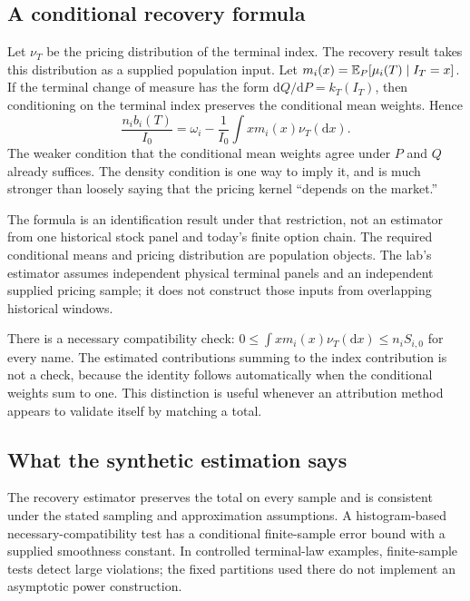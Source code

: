 \subsection{A conditional recovery formula}
Let $\nu_T$ be the pricing distribution of the terminal index. The recovery result takes this distribution as a supplied population
input. Let
$m_i(x)=\mathbb{E}_P[\mu_i(T)\mid I_T=x]$. If the terminal change of measure
has the form $\mathrm{d}Q/\mathrm{d}P=k_T(I_T)$, then conditioning on
the terminal index preserves the conditional mean weights. Hence
\begin{equation}\label{eq:recovery}
 \frac{n_i b_i(T)}{I_0}
   =\omega_i-\frac1{I_0}\int x m_i(x)\nu_T(\mathrm{d}x).
\end{equation}
The weaker condition that the conditional mean weights agree under
$P$ and $Q$ already suffices. The density condition is one way to imply
it, and is much stronger than loosely saying that the pricing kernel
``depends on the market.''

The formula is an identification result under that restriction, not an
estimator from one historical stock panel and today's finite option
chain. The required conditional means and pricing distribution are
population objects. The lab's estimator assumes independent physical
terminal panels and an independent supplied pricing sample; it does
not construct those inputs from overlapping historical windows.

There is a necessary compatibility check:
$0\leq\int x m_i(x)\nu_T(\mathrm{d}x)\leq n_iS_{i,0}$ for every
name. The estimated contributions summing to the index contribution
is not a check, because the identity follows automatically when the
conditional weights sum to one. This distinction is useful whenever
an attribution method appears to validate itself by matching a total.

\subsection{What the synthetic estimation says}
The recovery estimator preserves the total on every sample and is
consistent under the stated sampling and approximation assumptions.
A histogram-based necessary-compatibility test has a conditional
finite-sample error bound with a supplied smoothness constant. In
controlled terminal-law examples, finite-sample tests detect large
violations; the fixed partitions used there do not implement an asymptotic
power construction.

